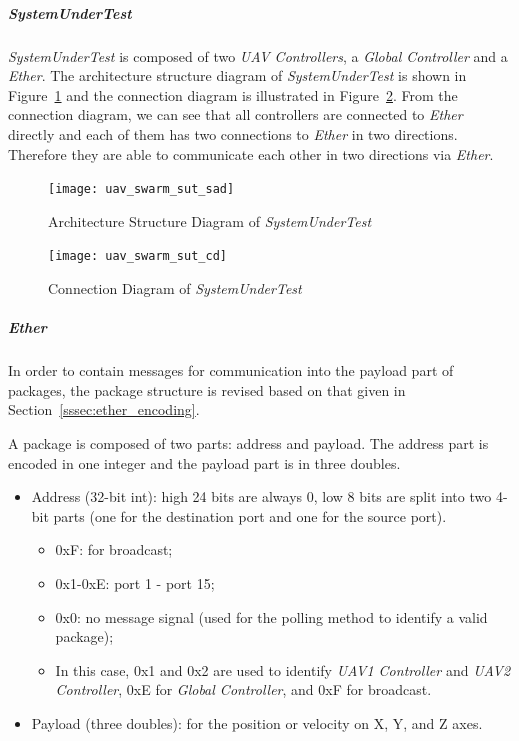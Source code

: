 \subparagraph{\emph{SystemUnderTest}}
\emph{SystemUnderTest} is composed of two \emph{UAV Controllers}, a \emph{Global Controller} and a \emph{Ether}. The architecture structure diagram of \emph{SystemUnderTest} is shown in Figure~\ref{fig:uav_swarm_sut_sad} and the connection diagram is illustrated in Figure~\ref{fig:uav_swarm_sut_cd}. From the connection diagram, we can see that all controllers are connected to \emph{Ether} directly and each of them has two connections to \emph{Ether} in two directions. Therefore they are able to communicate each other in two directions via \emph{Ether}. 

\begin{figure}[htb!]
    \centering
	\texttt{[image: uav\_swarm\_sut\_sad]}
    \caption{Architecture Structure Diagram of \emph{SystemUnderTest}}
    \label{fig:uav_swarm_sut_sad}
\end{figure}

\begin{figure}[htb!]
    \centering
	\texttt{[image: uav\_swarm\_sut\_cd]}
    \caption{Connection Diagram of \emph{SystemUnderTest}}
    \label{fig:uav_swarm_sut_cd}
\end{figure}

\subparagraph{Ether}
In order to contain messages for communication into the payload part of packages, the package structure is revised based on that given in Section~\ref{sssec:ether_encoding}.

A package is composed of two parts: address and payload. The address part is encoded in one integer and the payload part is in three doubles.
\begin{itemize}
    \item Address (32-bit int): high 24 bits are always 0, low 8 bits are split into two 4-bit parts (one for the destination port and one for the source port). 
        \begin{itemize}
            \item 0xF: for broadcast;
            \item 0x1-0xE: port 1 - port 15;
            \item 0x0: no message signal (used for the polling method to identify a valid package);
            \item In this case, 0x1 and 0x2 are used to identify \emph{UAV1 Controller} and \emph{UAV2 Controller}, 0xE for \emph{Global Controller}, and 0xF for broadcast.
        \end{itemize}
    \item Payload (three doubles): for the position or velocity on X, Y, and Z axes.
\end{itemize}

